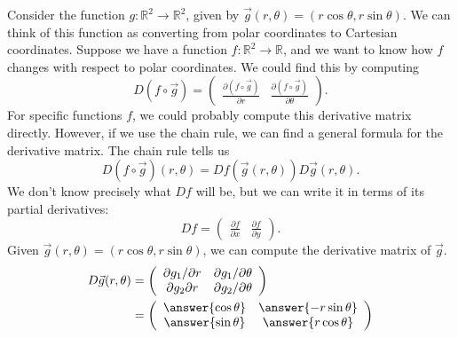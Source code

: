 \documentclass{ximera}
\begin{document}
\begin{example}
Consider the function $g:\mathbb{R}^2\rightarrow\mathbb{R}^2$, given by $\vec{g}(r,\theta) = (r\cos\theta, r\sin\theta)$. We can think of this function as converting from polar coordinates to Cartesian coordinates. Suppose we have a function $f:\mathbb{R}^2\rightarrow\mathbb{R}$, and we want to know how $f$ changes with respect to polar coordinates. We could find this by computing
\[
D(f\circ\vec{g}) = \left(\begin{array}{cc}\frac{\partial(f\circ \vec{g})}{\partial r} & \frac{\partial(f\circ \vec{g})}{\partial \theta}\end{array}\right).
\]
For specific functions $f$, we could probably compute this derivative matrix directly. However, if we use the chain rule, we can find a general formula for the derivative matrix. The chain rule tells us
\[
D(f\circ\vec{g})(r,\theta) = Df(\vec{g}(r,\theta))D\vec{g}(r,\theta).
\]
We don't know precisely what $Df$ will be, but we can write it in terms of its partial derivatives:
\[
Df = \left(\begin{array}{cc}\frac{\partial f}{\partial x} & \frac{\partial f}{\partial y} \end{array}\right).
\]
Given $\vec{g}(r,\theta) = (r\cos\theta, r\sin\theta)$, we can compute the derivative matrix of $\vec{g}$.
\begin{align*}
D\vec{g}(r,\theta) &= \left(\begin{array}{cc}
\partial g_1/\partial r & \partial g_1/\partial\theta\\
\partial g_2\partial r & \partial g_2/\partial\theta
\end{array}\right)\\
&= \left(\begin{array}{cc}
\answer{\cos\theta} & \answer{-r\sin\theta}\\
\answer{\sin\theta} & \answer{r\cos\theta}
\end{array}\right)
\end{align*}


\end{example}
\end{document}
